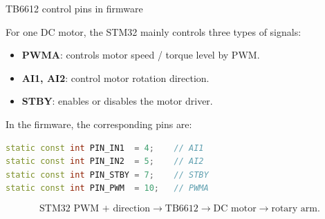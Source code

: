 \documentclass[aspectratio=169]{beamer}
\begin{document}
\begin{frame}[fragile]{TB6612 control pins in firmware}

For one DC motor, the STM32 mainly controls three types of signals:

\begin{itemize}
    \item \textbf{PWMA}: controls motor speed / torque level by PWM.
    \item \textbf{AI1, AI2}: control motor rotation direction.
    \item \textbf{STBY}: enables or disables the motor driver.
\end{itemize}

\vspace{0.15cm}

In the firmware, the corresponding pins are:

\begin{lstlisting}[language=C++]
static const int PIN_IN1  = 4;    // AI1
static const int PIN_IN2  = 5;    // AI2
static const int PIN_STBY = 7;    // STBY
static const int PIN_PWM  = 10;   // PWMA
\end{lstlisting}

\vspace{0.1cm}


\[
\text{STM32 PWM + direction}
\rightarrow
\text{TB6612}
\rightarrow
\text{DC motor}
\rightarrow
\text{rotary arm}.
\]

\end{frame}
\end{document}
